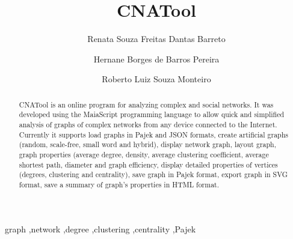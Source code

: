 \documentclass[preprint,12pt, a4paper]{elsarticle}
\begin{document}
\begin{frontmatter}



\title{CNATool}


\author[cimatec]{Renata Souza Freitas Dantas Barreto}
\author[cimatec]{Hernane Borges de Barros Pereira}
\author[cimatec]{Roberto Luiz Souza Monteiro}
\address[cimatec]{SENAI CIMATEC University Center\\Av. Orlando Gomes, 1845,\\Piat\~{a},\\Salvador - BA,\\41650-010}

\begin{abstract}
CNATool is an online program for analyzing complex and social networks.
It was developed using the MaiaScript programming language to allow
quick and simplified analysis of graphs of complex networks
from any device connected to the Internet. Currently it supports load graphs
in Pajek and JSON formats, create artificial graphs (random, scale-free,
small word and hybrid), display network graph, layout graph,
graph properties (average degree, density, average clustering coefficient,
average shortest path, diameter and graph efficiency, display detailed properties of
vertices (degrees, clustering and centrality), save graph in Pajek format,
export graph in SVG format, save a summary of graph’s properties in HTML format.
\end{abstract}

\begin{keyword}
graph \sep network \sep degree \sep clustering \sep centrality \sep Pajek



\end{keyword}

\end{frontmatter}
\end{document}
